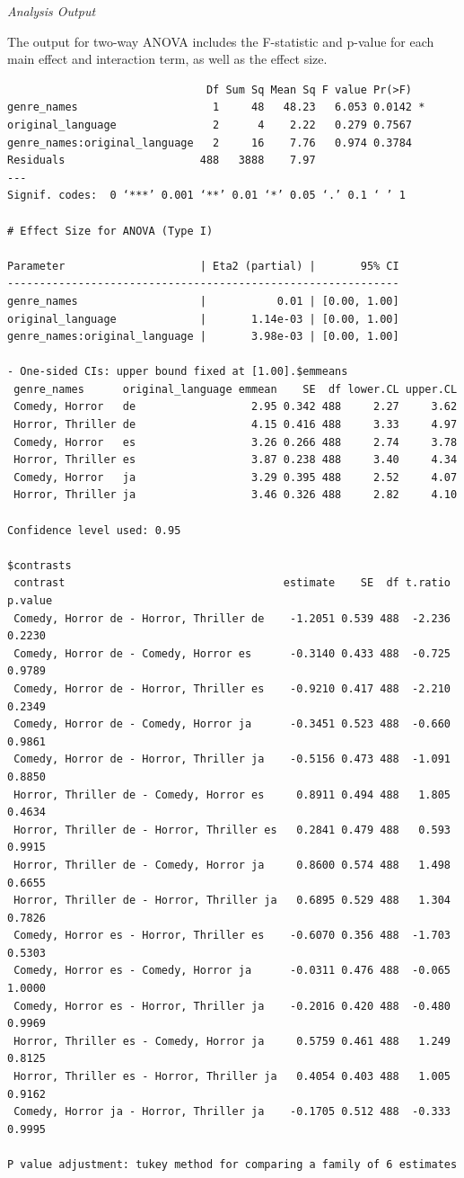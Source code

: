 \documentclass[
]{book}
\begin{document}
\emph{Analysis Output}

The output for two-way ANOVA includes the F-statistic and p-value for each main effect and interaction term, as well as the effect size.

\begin{verbatim}
                               Df Sum Sq Mean Sq F value Pr(>F)  
genre_names                     1     48   48.23   6.053 0.0142 *
original_language               2      4    2.22   0.279 0.7567  
genre_names:original_language   2     16    7.76   0.974 0.3784  
Residuals                     488   3888    7.97                 
---
Signif. codes:  0 ‘***’ 0.001 ‘**’ 0.01 ‘*’ 0.05 ‘.’ 0.1 ‘ ’ 1

# Effect Size for ANOVA (Type I)

Parameter                     | Eta2 (partial) |       95% CI
-------------------------------------------------------------
genre_names                   |           0.01 | [0.00, 1.00]
original_language             |       1.14e-03 | [0.00, 1.00]
genre_names:original_language |       3.98e-03 | [0.00, 1.00]

- One-sided CIs: upper bound fixed at [1.00].$emmeans
 genre_names      original_language emmean    SE  df lower.CL upper.CL
 Comedy, Horror   de                  2.95 0.342 488     2.27     3.62
 Horror, Thriller de                  4.15 0.416 488     3.33     4.97
 Comedy, Horror   es                  3.26 0.266 488     2.74     3.78
 Horror, Thriller es                  3.87 0.238 488     3.40     4.34
 Comedy, Horror   ja                  3.29 0.395 488     2.52     4.07
 Horror, Thriller ja                  3.46 0.326 488     2.82     4.10

Confidence level used: 0.95 

$contrasts
 contrast                                  estimate    SE  df t.ratio p.value
 Comedy, Horror de - Horror, Thriller de    -1.2051 0.539 488  -2.236  0.2230
 Comedy, Horror de - Comedy, Horror es      -0.3140 0.433 488  -0.725  0.9789
 Comedy, Horror de - Horror, Thriller es    -0.9210 0.417 488  -2.210  0.2349
 Comedy, Horror de - Comedy, Horror ja      -0.3451 0.523 488  -0.660  0.9861
 Comedy, Horror de - Horror, Thriller ja    -0.5156 0.473 488  -1.091  0.8850
 Horror, Thriller de - Comedy, Horror es     0.8911 0.494 488   1.805  0.4634
 Horror, Thriller de - Horror, Thriller es   0.2841 0.479 488   0.593  0.9915
 Horror, Thriller de - Comedy, Horror ja     0.8600 0.574 488   1.498  0.6655
 Horror, Thriller de - Horror, Thriller ja   0.6895 0.529 488   1.304  0.7826
 Comedy, Horror es - Horror, Thriller es    -0.6070 0.356 488  -1.703  0.5303
 Comedy, Horror es - Comedy, Horror ja      -0.0311 0.476 488  -0.065  1.0000
 Comedy, Horror es - Horror, Thriller ja    -0.2016 0.420 488  -0.480  0.9969
 Horror, Thriller es - Comedy, Horror ja     0.5759 0.461 488   1.249  0.8125
 Horror, Thriller es - Horror, Thriller ja   0.4054 0.403 488   1.005  0.9162
 Comedy, Horror ja - Horror, Thriller ja    -0.1705 0.512 488  -0.333  0.9995

P value adjustment: tukey method for comparing a family of 6 estimates 
\end{verbatim}
\end{document}
